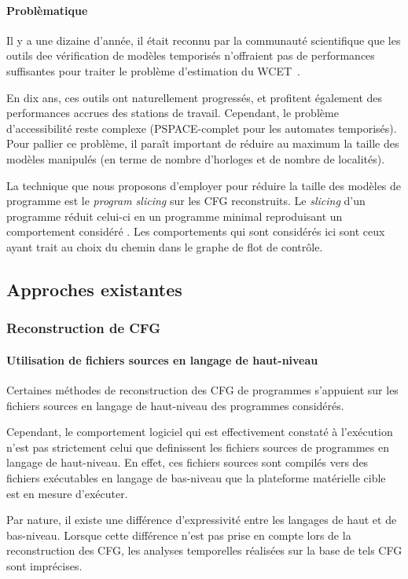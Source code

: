       \paragraph{Problèmatique}
      { 
        Il y a une dizaine d'année, il était reconnu par la communauté
        scientifique que les outils dee vérification de modèles temporisés
        n'offraient pas de performances suffisantes pour traiter le problème
        d'estimation du WCET~\cite{Wil04}.

        \medskip

        En dix ans, ces outils ont naturellement progressés, et profitent
        également des performances accrues des stations de travail. Cependant,
        le problème d'accessibilité reste complexe (PSPACE-complet pour les
        automates temporisés).
        Pour pallier ce problème, il paraît important de réduire au maximum la
        taille des modèles manipulés (en terme de nombre d'horloges et de nombre
        de localités).

        La technique que nous proposons d'employer pour réduire la taille des
        modèles de programme est le \textit{program slicing} sur les CFG
        reconstruits. Le \textit{slicing} d'un programme réduit celui-ci en un
        programme minimal reproduisant un comportement considéré
        \cite{Wei81}. Les comportements qui sont considérés ici sont ceux ayant
        trait au choix du chemin dans le graphe de flot de contrôle. }

  
  \subsection{Approches existantes}
    \subsubsection{Reconstruction de CFG}
      \paragraph{Utilisation de fichiers sources en langage de haut-niveau}
      { Certaines méthodes de reconstruction des CFG de programmes s'appuient
        sur les fichiers sources en langage de haut-niveau des programmes
        considérés.

        Cependant, le comportement logiciel qui est effectivement constaté à
        l'exécution n'est pas strictement celui que definissent les fichiers
        sources de programmes en langage de haut-niveau. En effet, ces fichiers
        sources sont compilés vers des fichiers exécutables en langage de
        bas-niveau que la plateforme matérielle cible est en mesure
        d'exécuter.

        Par nature, il existe une différence d'expressivité entre les langages
        de haut et de bas-niveau. Lorsque cette différence n'est pas prise en
        compte lors de la reconstruction des CFG, les analyses temporelles
        réalisées sur la base de tels CFG sont imprécises.}%
      
